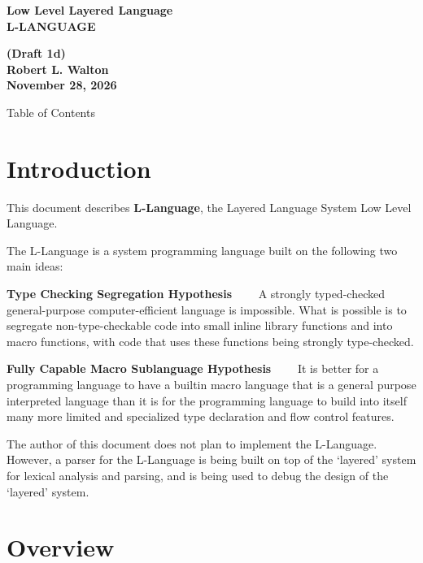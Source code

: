 \documentclass[12pt]{article}
\makeatletter
\renewcommand\tableofcontents{%
    \begin{list}{}%
	     {\setlength{\itemsep}{0in}%
	      \setlength{\topsep}{0in}%
	      \setlength{\parsep}{1ex}%
	      \setlength{\labelwidth}{0in}%
	      \setlength{\baselineskip}{1.5ex}%
	      \setlength{\leftmargin}{0.4in}%
	      \setlength{\rightmargin}{0.4in}}%
    \item\@starttoc{toc}%
    \end{list}}
\newcommand{\key}[1]{{\rm \bfseries #1}}
\newenvironment{indpar}[1][0.3in]%
	{\begin{list}{}%
		     {\setlength{\itemsep}{0in}%
		      \setlength{\topsep}{0in}%
		      \setlength{\parsep}{1ex}%
		      \setlength{\labelwidth}{#1}%
		      \setlength{\leftmargin}{#1}%
		      \addtolength{\leftmargin}{\labelsep}}%
	 \item}%
	{\end{list}}
\makeatother
\begin{document}
\begin{center}
\Large \bf
Low Level Layered Language\\[0.5ex]
\huge \bf
L-LANGUAGE
\end{center}
\begin{center}
\large \bf
(Draft 1d)
\\[0.5ex]
Robert L. Walton\\
November 28, 2026

\bigskip

Table of Contents
\end{center}

\bigskip

\tableofcontents

\newpage

\section{Introduction}

This document describes \key{L-Language}, the Layered Language
System Low Level Language.

The L-Language is a system programming language built on the
following two main ideas:

\begin{indpar}

\key{Type Checking Segregation Hypothesis}~~~~ A strongly typed-checked
general-purpose computer-efficient language is impossible.
What is possible is
to segregate non-type-checkable code into small inline
library functions and into macro functions,
with code that uses these functions being
strongly type-checked.

\key{Fully Capable Macro Sublanguage Hypothesis}~~~~ It is better for
a programming language to have a builtin macro language that
is a general purpose interpreted language than it is for the
programming language to build into itself
many more limited and specialized type declaration and
flow control features.

\end{indpar}

The author of this document does not plan to implement the L-Language.
However, a parser for the L-Language is being built on top of the
`layered' system for lexical analysis and parsing, and is being used
to debug the design of the `layered' system.

\section{Overview}
\end{document}
